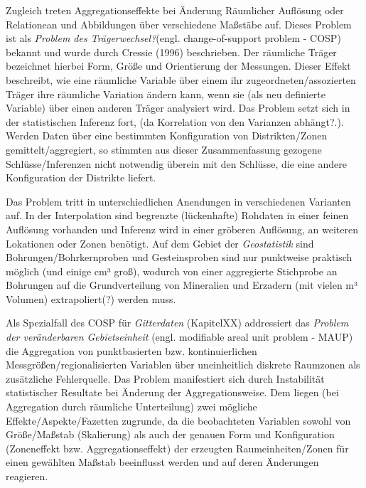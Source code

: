 Zugleich treten Aggregationseffekte bei Änderung Räumlicher Auflösung oder Relationean und Abbildungen über verschiedene Maßstäbe auf.
Dieses Problem ist als \emph{Problem des Trägerwechsel?}(engl. change-of-support problem - COSP) bekannt und 
wurde durch Cressie (1996) beschrieben. Der räumliche Träger bezeichnet hierbei Form, Größe und Orientierung der Messungen. 
Dieser Effekt beschreibt, wie eine räumliche Variable über einem ihr zugeordneten/assozierten Träger ihre räumliche Variation ändern kann, wenn 
sie (als neu definierte Variable) über einen anderen Träger analysiert wird.
Das Problem setzt sich in der statistischen Inferenz fort, (da Korrelation von den Varianzen abhängt?.). Werden Daten über eine bestimmten Konfiguration von Distrikten/Zonen
gemittelt/aggregiert, so stimmten aus dieser Zusammenfassung gezogene Schlüsse/Inferenzen nicht notwendig überein mit den Schlüsse, die eine andere Konfiguration der Distrikte liefert.

Das Problem tritt in unterschiedlichen Anendungen in verschiedenen Varianten auf. In der Interpolation sind begrenzte (lückenhafte) Rohdaten in einer feinen Auflösung 
vorhanden und Inferenz wird in einer gröberen Auflösung, an weiteren Lokationen oder Zonen benötigt. 
Auf dem Gebiet der \emph{Geostatistik} sind Bohrungen/Bohrkernproben und Gesteinsproben sind nur punktweise praktisch möglich (und einige cm³ groß), 
wodurch von einer aggregierte Stichprobe an Bohrungen auf die Grundverteilung von Mineralien und Erzadern (mit vielen m³ Volumen) extrapoliert(?) werden muss. 

Als Spezialfall des COSP für \emph{Gitterdaten} (KapitelXX) addressiert das \emph{Problem der veränderbaren Gebietseinheit} (engl. modifiable areal unit problem - MAUP)
die Aggregation von punktbasierten bzw. kontinuierlichen Messgrößen/regionalisierten Variablen über uneinheitlich diskrete Raumzonen als zusätzliche Fehlerquelle. 
Das Problem manifestiert sich durch Instabilität statistischer Resultate bei Änderung der Aggregationsweise. 
Dem liegen (bei Aggregation durch räumliche Unterteilung) zwei mögliche Effekte/Aspekte/Fazetten zugrunde, da die beobachteten 
Variablen sowohl von Größe/Maßstab (Skalierung) als auch der genauen Form und Konfiguration (Zoneneffekt bzw. Aggregationseffekt) der erzeugten Raumeinheiten/Zonen für einen gewählten Maßstab
beeinflusst werden und auf deren Änderungen reagieren. 

